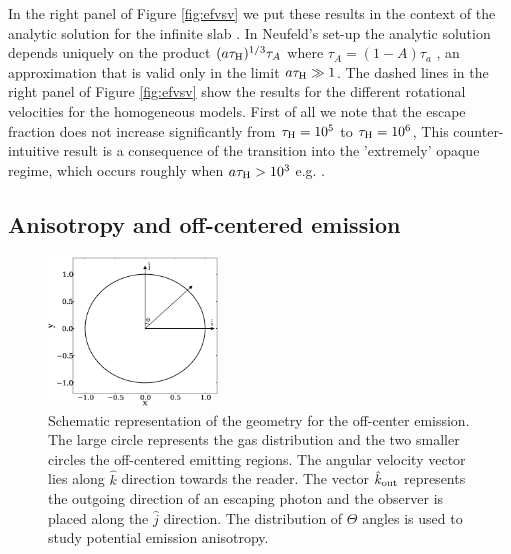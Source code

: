 \documentclass{emulateapj}
\newcommand{\ly}{{\ifmmode{{\rm Ly}\alpha~}\else{Ly$\alpha$~}\fi}}
\begin{document}
In the right panel of Figure \ref{fig:efvsv} we put these results in the context of
the analytic solution for the infinite slab \citep{Neufeld90}. In
Neufeld's set-up the analytic solution depends uniquely on the product
$(a\tau_{\rm   H})^{1/3}\tau_{A}$ where $\tau_{A} = (1 - A)\tau_{a}$ , an approximation 
that is valid only in the limit $a\tau_{\rm   H}\gg 1$. The dashed lines in
 the right panel of Figure \ref{fig:efvsv} show the results for the different rotational
velocities for the homogeneous models. First of all we note that the escape fraction does not
increase significantly from $\tau_{\rm H}=10^{5}$ to $\tau_{\rm H}=10^{6}$, This
 counter-intuitive result is a consequence of the transition into the 'extremely' opaque regime,
  which occurs roughly when $a\tau_{\rm{H}} > 10^{3}$ e.g. \citep{Neufeld90}.

\iffalse
\subsection{Anisotropy and off-centered emission}
\label{sec:off-center}

\begin{figure}
\begin{center}
  \includegraphics[width=0.40\textwidth]{f8.eps}
\end{center}
\caption{Schematic representation of the geometry for the off-center
  emission. The large circle represents the gas distribution and the
    two smaller circles the off-centered \ly emitting regions. The angular
    velocity vector lies along $\hat{k}$ direction
    towards the reader. The vector $\hat{k}_{\rm out}$ represents the
    outgoing direction of an escaping \ly photon and the observer is
    placed along the $\hat{j}$ direction. The distribution of $\Theta$
    angles is used to study potential emission anisotropy. 
    \label{fig:OCspheres}}
\end{figure}
\end{document}
